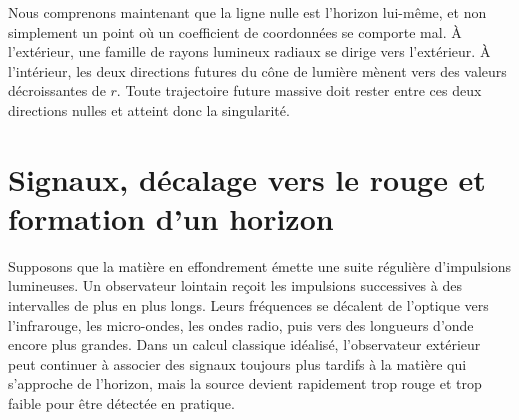 Nous comprenons maintenant que la ligne nulle est l’horizon lui-même, et non simplement un point où un coefficient de coordonnées se comporte mal. À l’extérieur, une famille de rayons lumineux radiaux se dirige vers l’extérieur. À l’intérieur, les deux directions futures du cône de lumière mènent vers des valeurs décroissantes de \(r\). Toute trajectoire future massive doit rester entre ces deux directions nulles et atteint donc la singularité.

\section{Signaux, décalage vers le rouge et formation d’un horizon}

Supposons que la matière en effondrement émette une suite régulière d’impulsions lumineuses. Un observateur lointain reçoit les impulsions successives à des intervalles de plus en plus longs. Leurs fréquences se décalent de l’optique vers l’infrarouge, les micro-ondes, les ondes radio, puis vers des longueurs d’onde encore plus grandes. Dans un calcul classique idéalisé, l’observateur extérieur peut continuer à associer des signaux toujours plus tardifs à la matière qui s’approche de l’horizon, mais la source devient rapidement trop rouge et trop faible pour être détectée en pratique.

\begin{classroomqa}
\end{classroomqa}

\begin{classroomqa}
\end{classroomqa}

